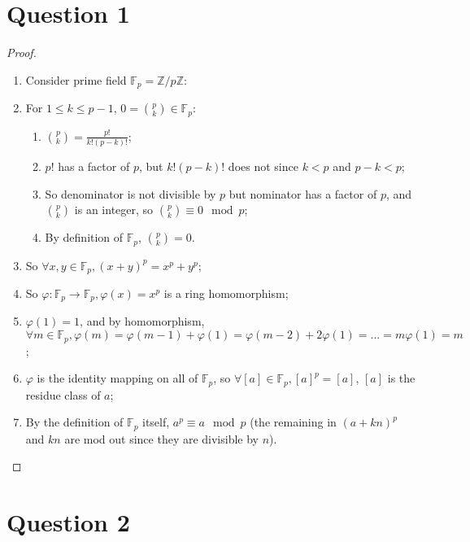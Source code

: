 \documentclass{article}
\begin{document}
\section*{Question 1}

\begin{proof}
~
    \begin{enumerate}
        \item Consider prime field $\mathbb{F}_p=\mathbb{Z}/p\mathbb{Z}$:
        \item For $1\leq k\leq p-1$, $0=\binom{p}{k}\in \mathbb{F}_p$:
        \begin{enumerate}
            \item $\binom{p}{k}=\frac{p!}{k!(p-k)!}$;
            \item $p!$ has a factor of $p$, but $k!(p-k)!$ does not since $k< p$ and $p-k<p$;
            \item So denominator is not divisible by $p$ but nominator has a factor of $p$, and $\binom{p}{k}$ is an integer, so $\binom{p}{k}\equiv 0 \mod{p}$;
            \item By definition of $\mathbb{F}_p$, $\binom{p}{k}=0$.
        \end{enumerate}
        \item So $\forall x,y\in \mathbb{F}_p,(x+y)^p=x^p+y^p$;
        \item So $\varphi:\mathbb{F}_p\to\mathbb{F}_p,\varphi(x)=x^p$ is a ring homomorphism;
        \item $\varphi(1)=1$, and by homomorphism, $\forall m\in \mathbb{F}_p,\varphi(m)=\varphi(m-1)+\varphi(1)=\varphi(m-2)+2\varphi(1)=...=m\varphi(1)=m$;
        \item $\varphi$ is the identity mapping on all of $\mathbb{F}_p$,  so $\forall [a]\in \mathbb{F}_p, [a]^p=[a]$, $[a]$ is the residue class of $a$;
        \item By the definition of $\mathbb{F}_p$ itself, $a^p\equiv a\mod p$ (the remaining in $(a+kn)^p$ and $kn$ are mod out since they are divisible by $n$).
    \end{enumerate}
\end{proof}

\newpage

\section*{Question 2}
\end{document}
